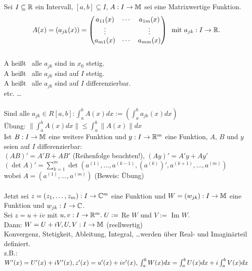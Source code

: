 \documentclass[a4paper,twoside,DIV15,BCOR12mm]{scrbook}
\begin{document}
\begin{definition}
Sei $I \subseteq \mathbb{R}$ ein Intervall, $[a, b] \subseteq I$, $A : I \rightarrow \mathbb{M}$ sei eine Matrixwertige Funktion. \\
$$A(x) = (a_{jk}(x)) = \begin{pmatrix}
a_{11}(x) & \cdots & a_{1m}(x) \\
\vdots & & \vdots \\
a_{m1}(x) & \cdots & a_{mm}(x) \end{pmatrix} \;\; \text{mit } a_{jk} : I \rightarrow \mathbb{R}.$$ \\
A heißt  \equizu \, alle $a_{jk}$ sind in $x_0$ stetig. \\
A heißt  \equizu \, alle $a_{jk}$ sind auf $I$ stetig. \\
A heißt  \equizu \, alle $a_{jk}$ sind auf $I$ differenzierbar. \\
etc. \ldots \\\\
Sind alle $a_{jk} \in R[a, b]: \int_{a}^{b} A(x) dx := (\int_{a}^{b} a_{jk}(x) dx)$ \\
Übung: $\|\int_{a}^{b} A(x) dx \| \leq \int_{a}^{b} \|A(x)\| dx$ \\
Ist $B: I \rightarrow \mathbb{M}$ eine weitere Funktion und $y: I \rightarrow \mathbb{R}^m$ eine Funktion, $A$, $B$ und $y$ seien auf $I$ differenzierbar: \\
$(AB)' = A'B + AB'$ (Reihenfolge beachten!), $(Ay)' = A'y + Ay'$ \\
$(\det A)' = \sum_{k=1}^{m} \det (a^{(1)}, \ldots, a^{(k-1)}, (a^{(k)})', a^{(k+1)}, \ldots, a^{(m)})$ \\
wobei $A = (a^{(1)}, \ldots, a^{(m)})$ \; (Beweis: Übung)\\\\
Jetzt sei $z = (z_1, \ldots, z_m) : I \rightarrow \mathbb{C}^m$ eine Funktion und $W = (w_{jk}): I \rightarrow \mathbb{M}$ eine Funktion und $w_{jk} : I \rightarrow \mathbb{C}$. \\
Sei $z = u + iv$ mit $u, v: I \rightarrow \mathbb{R}^m. \; U := $ Re $W$ und $V := $ Im $W$. \\
Dann: $W = U + iV, U,V: I \rightarrow \mathbb{M}$ (reellwertig) \\
Konvergenz, Stetigkeit, Ableitung, Integral, \ldots werden über Real- und Imaginärteil definiert. \\
z.B.: $W'(x) = U'(x) + iV'(x), z'(x) = u'(x) + iv'(x), 
\\ \int_{a}^{b} W(x) dx = \int_{a}^{b} U(x) dx + i\int_{a}^{b} V(x) dx$ \\

\end{definition}
\end{document}
